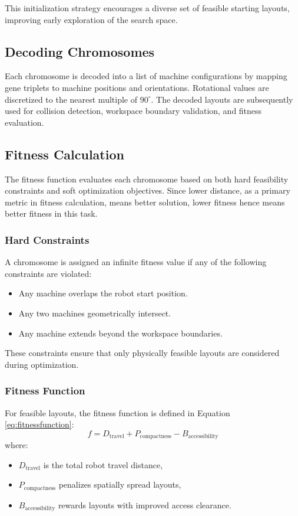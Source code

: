 \documentclass{article}
\begin{document}
This initialization strategy encourages a diverse set of feasible starting layouts, improving early exploration of the search space.

\subsection{Decoding Chromosomes}

Each chromosome is decoded into a list of machine configurations by mapping gene triplets to machine positions and orientations. Rotational values are discretized to the nearest multiple of $90^\circ$. The decoded layouts are subsequently used for collision detection, workspace boundary validation, and fitness evaluation.

\subsection{Fitness Calculation}

The fitness function evaluates each chromosome based on both hard feasibility constraints and soft optimization objectives. Since lower distance, as a primary metric in fitness calculation, means better solution, lower fitness hence means better fitness in this task.

\subsubsection{Hard Constraints}

A chromosome is assigned an infinite fitness value if any of the following constraints are violated:
\begin{itemize}
    \item Any machine overlaps the robot start position.
    \item Any two machines geometrically intersect.
    \item Any machine extends beyond the workspace boundaries.
\end{itemize}

These constraints ensure that only physically feasible layouts are considered during optimization.

\subsubsection{Fitness Function}
For feasible layouts, the fitness function is defined in Equation \ref{eq:fitnessfunction}:
\begin{equation}
    f = D_{\text{travel}} + P_{\text{compactness}} - B_{\text{accessibility}}
    \label{eq:fitnessfunction}
\end{equation}
where:
\begin{itemize}
    \item $D_{\text{travel}}$ is the total robot travel distance,
    \item $P_{\text{compactness}}$ penalizes spatially spread layouts,
    \item $B_{\text{accessibility}}$ rewards layouts with improved access clearance.
\end{itemize}
\end{document}

